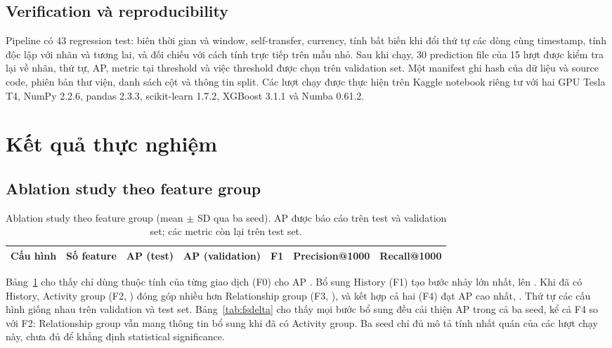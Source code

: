 \documentclass[sigconf,nonacm]{acmart}
\begin{document}
\subsection{Verification và reproducibility}

Pipeline có 43 regression test: biên thời gian và window, self-transfer, currency, tính bất biến khi đổi thứ tự các
dòng cùng timestamp, tính độc lập với nhãn và tương lai, và đối chiếu với cách tính trực tiếp trên mẫu nhỏ. Sau khi
chạy, 30 prediction file của 15 lượt được kiểm tra lại về nhãn, thứ tự, AP, metric tại threshold và việc threshold
được chọn trên validation set. Một manifest ghi hash của dữ liệu và source code, phiên bản thư viện, danh sách cột và
thông tin split. Các lượt chạy được thực hiện trên Kaggle notebook riêng tư với hai GPU Tesla T4, NumPy 2.2.6, pandas
2.3.3, scikit-learn 1.7.2, XGBoost 3.1.1 và Numba 0.61.2.

\section{Kết quả thực nghiệm}

\subsection{Ablation study theo feature group}

\begin{table}[t]
\caption{Ablation study theo feature group (mean $\pm$ SD qua ba seed). AP được báo cáo trên test và validation set;
các metric còn lại trên test set.}
\label{tab:features}
\begin{tabular}{lrccccc}
\toprule
Cấu hình & Số feature & AP (test) & AP (validation) & F1 & Precision@1000 & Recall@1000 \\
\midrule

\end{tabular}
\end{table}

Bảng~\ref{tab:features} cho thấy chỉ dùng thuộc tính của từng giao dịch (F0) cho AP \FZeroAP. Bổ sung History (F1)
tạo bước nhảy lớn nhất, lên \FOneAP. Khi đã có History, Activity group (F2, \FTwoAP) đóng góp nhiều hơn Relationship
group (F3, \FThreeAP), và kết hợp cả hai (F4) đạt AP cao nhất, \FFourAP. Thứ tự các cấu hình giống nhau trên
validation và test set. Bảng~\ref{tab:fsdelta} cho thấy mọi bước bổ sung đều cải thiện AP trong cả ba seed, kể cả F4
so với F2: Relationship group vẫn mang thông tin bổ sung khi đã có Activity group. Ba seed chỉ đủ mô tả tính nhất
quán của các lượt chạy này, chưa đủ để khẳng định statistical significance.
\end{document}
